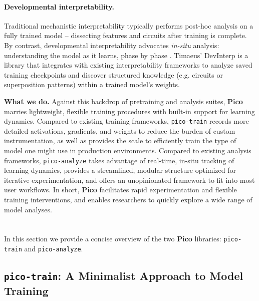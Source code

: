 {\paragraph{Developmental interpretability.} Traditional mechanistic interpretability typically performs post-hoc analysis on a fully trained model – dissecting features and circuits after training is complete. By contrast, developmental interpretability advocates \textit{in-situ} analysis: understanding the model as it learns, phase by phase \cite{hoogland2023towards,devinterpcode, hoogland2025losslandscape}. Timaeus' DevInterp \cite{devinterpcode} is a library that integrates with existing interpretability frameworks to analyze saved training checkpoints and discover structured knowledge (e.g. circuits or superposition patterns) within a trained model’s weights. 

\textbf{What we do.} Against this backdrop of pretraining and analysis suites, \textbf{Pico} marries lightweight, flexible training procedures with built-in support for learning dynamics. Compared to existing training frameworks, \texttt{pico-train} records more detailed activations, gradients, and weights to reduce the burden of custom instrumentation, as well as provides the scale to efficiently train the type of model one might use in production environments. Compared to existing analysis frameworks, \texttt{pico-analyze} takes advantage of real-time, in-situ tracking of learning dynamics, provides a streamlined, modular structure optimized for iterative experimentation, and offers an unopinionated framework to fit into most user workflows. In short, \textbf{Pico} facilitates rapid experimentation and flexible training interventions, and enables researchers to quickly explore a wide range of model analyses.%

\section{\picolarge}

In this section we provide a concise overview of the two \textbf{Pico} libraries: \texttt{pico-train} and \texttt{pico-analyze}. 


\subsection{\texttt{pico-train}: A Minimalist Approach to Model Training}

}
